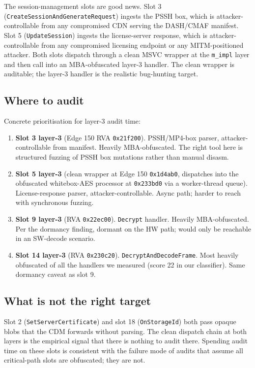 \documentclass[11pt,letterpaper]{article}
\begin{document}
The session-management slots are good news. Slot 3
(\texttt{CreateSessionAndGenerateRequest}) ingests the PSSH box,
which is attacker-controllable from any compromised CDN serving
the DASH/CMAF manifest. Slot 5 (\texttt{UpdateSession}) ingests
the license-server response, which is attacker-controllable from
any compromised licensing endpoint or any MITM-positioned attacker.
Both slots dispatch through a clean MSVC wrapper at the
\texttt{m\_impl} layer and then call into an MBA-obfuscated
layer-3 handler. The clean wrapper is auditable; the layer-3
handler is the realistic bug-hunting target.

\subsection{Where to audit}

Concrete prioritisation for layer-3 audit time:

\begin{enumerate}[itemsep=2pt]
  \item \textbf{Slot 3 layer-3} (Edge 150 RVA \texttt{0x21f200}).
        PSSH/MP4-box parser, attacker-controllable from manifest.
        Heavily MBA-obfuscated. The right tool here is structured
        fuzzing of PSSH box mutations rather than manual disasm.
  \item \textbf{Slot 5 layer-3} (clean wrapper at Edge 150
        \texttt{0x1d4ab0}, dispatches into the obfuscated
        whitebox-AES processor at \texttt{0x233bd0} via a
        worker-thread queue). License-response parser,
        attacker-controllable. Async path; harder to reach with
        synchronous fuzzing.
  \item \textbf{Slot 9 layer-3} (RVA \texttt{0x22ec00}).
        \texttt{Decrypt} handler. Heavily MBA-obfuscated. Per the
        dormancy finding, dormant on the HW path; would only be
        reachable in an SW-decode scenario.
  \item \textbf{Slot 14 layer-3} (RVA \texttt{0x230c20}).
        \texttt{DecryptAndDecodeFrame}. Most heavily obfuscated of
        all the handlers we measured (score 22 in our classifier).
        Same dormancy caveat as slot 9.
\end{enumerate}

\subsection{What is not the right target}

Slot 2 (\texttt{SetServerCertificate}) and slot 18
(\texttt{OnStorageId}) both pass opaque blobs that the CDM
forwards without parsing. The clean dispatch chain at both layers
is the empirical signal that there is nothing to audit there.
Spending audit time on these slots is consistent with the failure
mode of audits that assume all critical-path slots are obfuscated;
they are not.
\end{document}

